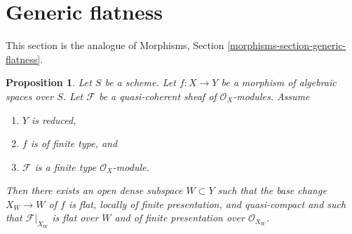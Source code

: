 \documentclass{stacks-project}
\theoremstyle{plain}
\newtheorem{proposition}[subsection]{Proposition}
\theoremstyle{definition}
\theoremstyle{remark}
\numberwithin{equation}{subsection}
\begin{document}
\section{Generic flatness}
\label{section-generic-flatness}

\noindent
This section is the analogue of
Morphisms, Section \ref{morphisms-section-generic-flatness}.

\begin{proposition}
\label{proposition-generic-flatness-reduced}
Let $S$ be a scheme.
Let $f : X \to Y$ be a morphism of algebraic spaces over $S$.
Let $\mathcal{F}$ be a quasi-coherent sheaf of $\mathcal{O}_X$-modules.
Assume
\begin{enumerate}
\item $Y$ is reduced,
\item $f$ is of finite type, and
\item $\mathcal{F}$ is a finite type $\mathcal{O}_X$-module.
\end{enumerate}
Then there exists an open dense subspace $W \subset Y$ such that
the base change $X_W \to W$ of $f$ is flat, locally of finite presentation, and
quasi-compact and such that $\mathcal{F}|_{X_W}$ is flat over $W$ and of
finite presentation over $\mathcal{O}_{X_W}$.
\end{proposition}
\end{document}
